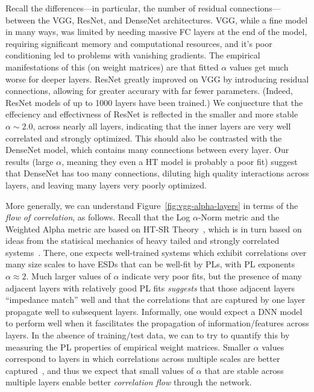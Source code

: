 Recall the differences---in particular, the number of residual connections---between the VGG, ResNet, and DenseNet architectures.
VGG, while a fine model in many ways, was limited by needing massive FC layers at the end of the model, requiring significant memory and computational resources, and it's poor conditioning led to problems with vanishing gradients.  
The empirical manifestations of this (on weight matrices) are that fitted $\alpha$ values get much worse for deeper layers.
ResNet greatly improved on VGG by introducing residual connections, allowing for greater accurary with far fewer parameters.
(Indeed, ResNet models of up to 1000 layers have been trained.) 
We conjuecture that the effeciency and effectivness of ResNet is reflected in the smaller and more stable $\alpha\sim 2.0$, across nearly all layers, indicating that the inner layers are very well correlated and strongly optimized.
This should also be contrasted with the DenseNet model, which contains many connections between every layer.
Our results (large $\alpha$, meaning they even a HT model is probably a poor fit) suggest that DenseNet has too many connections, diluting high quality interactions across layers, and leaving many layers very poorly optimized.

More generally, we can understand Figure~\ref{fig:vgg-alpha-layers} in terms of the \emph{flow of correlation}, as follows.
Recall that the Log $\alpha$-Norm metric and the Weighted Alpha metric are based on HT-SR Theory~\cite{MM18_TR, MM19_HTSR_ICML, MM20_SDM}, which is in turn based on ideas from the statisical mechanics of heavy tailed and strongly correlated systems~\cite{BouchaudPotters03, SornetteBook, BP11, bun2017}. 
There, one expects well-trained systems which exhibit correlations over many size scales to have ESDs that can be well-fit by PLs, with PL exponents $\alpha\approx 2$.
Much larger values of $\alpha$ indicate very poor fits, but the presence of many adjacent layers with relatively good PL fits \emph{suggests} that those adjacent layers ``impedance match'' well and that the correlations that are captured by one layer propagate well to subsequent layers.
Informally, one would expect a DNN model to perform well when it fascilitates the propagation of information/features across layers.
In the absence of training/test data, we can to try to quantify this by measuring the PL properties of empirical weight matrices.
Smaller $\alpha$ values correspond to layers in which correlations across multiple scales are better captured~\cite{MM18_TR,SornetteBook}, and thus we expect that small values of $\alpha$ that are stable across multiple layers enable better \emph{correlation flow} through the network.


